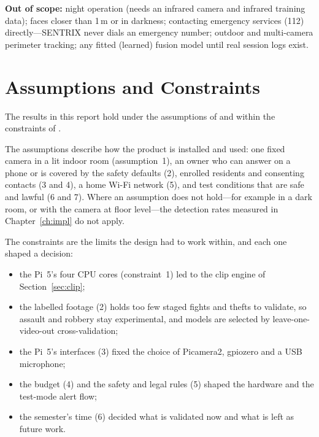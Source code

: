 \textbf{Out of scope:} night operation (needs an infrared camera and infrared training data); faces closer than 1\,m or in darkness; contacting emergency services (112) directly---SENTRIX never dials an emergency number; outdoor and multi-camera perimeter tracking; any fitted (learned) fusion model until real session logs exist.

\section{Assumptions and Constraints}
\label{sec:assumptions}
The results in this report hold under the assumptions of  and within the constraints of .

The assumptions describe how the product is installed and used: one fixed camera in a lit indoor room (assumption~1), an owner who can answer on a phone or is covered by the safety defaults (2), enrolled residents and consenting contacts (3 and 4), a home Wi-Fi network (5), and test conditions that are safe and lawful (6 and 7). Where an assumption does not hold---for example in a dark room, or with the camera at floor level---the detection rates measured in Chapter~\ref{ch:impl} do not apply.

The constraints are the limits the design had to work within, and each one shaped a decision:
\begin{itemize}
\item the Pi~5's four CPU cores (constraint~1) led to the clip engine of Section~\ref{sec:clip};
\item the labelled footage (2) holds too few staged fights and thefts to validate, so assault and robbery stay experimental, and models are selected by leave-one-video-out cross-validation;
\item the Pi~5's interfaces (3) fixed the choice of Picamera2, gpiozero and a USB microphone;
\item the budget (4) and the safety and legal rules (5) shaped the hardware and the test-mode alert flow;
\item the semester's time (6) decided what is validated now and what is left as future work.
\end{itemize}

